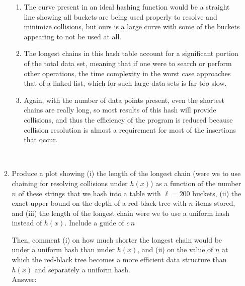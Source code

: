 \documentclass[12pt]{article}
\begin{document}
\begin{enumerate}
\begin{enumerate}
\begin{enumerate}
            \item
            
            The curve present in an ideal hashing function would be a straight line showing all buckets are being used properly to resolve and minimize collisions, but ours is a large curve with some of the buckets appearing to not be used at all.\\
            
            \item
            
            The longest chains in this hash table account for a significant portion of the total data set, meaning that if one were to search or perform other operations, the time complexity in the worst case approaches that of a linked list, which for such large data sets is far too slow.\\
            
            \item
            
            Again, with the number of data points present, even the shortest chains are really long, so most results of this hash will provide collisions, and thus the efficiency of the program is reduced because collision resolution is almost a requirement for most of the insertions that occur.\\
            
        \end{enumerate}\\
        
        \item 
        
        Produce a plot showing (i) the length of the longest chain (were we to use chaining for resolving collisions under $h(x)$) as a function of the number $n$ of these strings that we hash into a table with $\ell=200$ buckets, (ii) the exact upper bound on the depth of a red-black tree with $n$ items stored, and (iii) the length of the longest chain were we to use a uniform hash instead of $h(x)$. Include a guide of $c\,n$
    	
    	Then, comment (i) on how much shorter the longest chain would be under a uniform hash than under $h(x)$, and (ii) on the value of $n$ at which the red-black tree becomes a more efficient data structure than $h(x)$ and separately a uniform hash.\\
        
        Answer:\\
    

\end{enumerate}
\end{enumerate}
\end{document}
